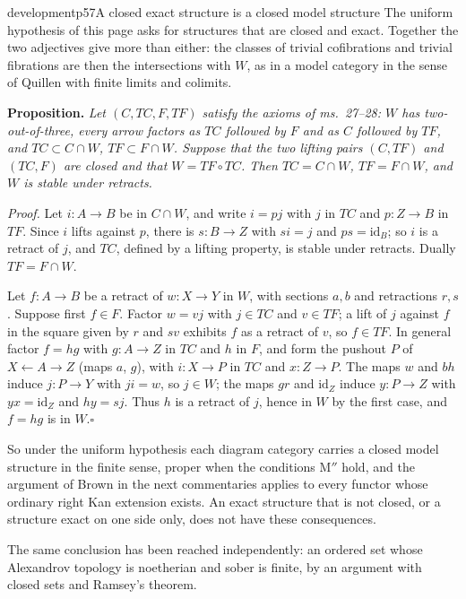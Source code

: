 \begin{dcomment}{development}{p57}{A closed exact structure is a closed model structure}
The uniform hypothesis of this page asks for structures that are closed and exact. Together the two adjectives give more than either: the classes of trivial cofibrations and trivial fibrations are then the intersections with $W$, as in a model category in the sense of Quillen with finite limits and colimits.

\textbf{Proposition.}\ours
\textit{Let $(C,TC,F,TF)$ satisfy the axioms of ms.~27--28: $W$ has two-out-of-three, every arrow factors as $TC$ followed by $F$ and as $C$ followed by $TF$, and $TC\subset C\cap W$, $TF\subset F\cap W$. Suppose that the two lifting pairs $(C,TF)$ and $(TC,F)$ are closed and that $W=TF\circ TC$. Then $TC=C\cap W$, $TF=F\cap W$, and $W$ is stable under retracts.}

\textit{Proof.}
Let $i:A\to B$ be in $C\cap W$, and write $i=pj$ with $j$ in $TC$ and $p:Z\to B$ in $TF$. Since $i$ lifts against $p$, there is $s:B\to Z$ with $si=j$ and $ps=\mathrm{id}_B$; so $i$ is a retract of $j$, and $TC$, defined by a lifting property, is stable under retracts. Dually $TF=F\cap W$.

Let $f:A\to B$ be a retract of $w:X\to Y$ in $W$, with sections $a,b$ and retractions $r,s$. Suppose first $f\in F$. Factor $w=vj$ with $j\in TC$ and $v\in TF$; a lift of $j$ against $f$ in the square given by $r$ and $sv$ exhibits $f$ as a retract of $v$, so $f\in TF$. In general factor $f=hg$ with $g:A\to Z$ in $TC$ and $h$ in $F$, and form the pushout $P$ of $X\leftarrow A\to Z$ (maps $a$, $g$), with $i:X\to P$ in $TC$ and $x:Z\to P$. The maps $w$ and $bh$ induce $j:P\to Y$ with $ji=w$, so $j\in W$; the maps $gr$ and $\mathrm{id}_Z$ induce $y:P\to Z$ with $yx=\mathrm{id}_Z$ and $hy=sj$. Thus $h$ is a retract of $j$, hence in $W$ by the first case, and $f=hg$ is in $W$.\hfill$\square$

So under the uniform hypothesis each diagram category carries a closed model structure in the finite sense, proper when the conditions M$''$ hold, and the argument of Brown in the next commentaries applies to every functor whose ordinary right Kan extension exists. An exact structure that is not closed, or a structure exact on one side only, does not have these consequences.
\end{dcomment}

The same conclusion has been reached independently: an ordered set whose Alexandrov topology is noetherian and sober is finite, by an argument with closed sets and Ramsey's theorem.


